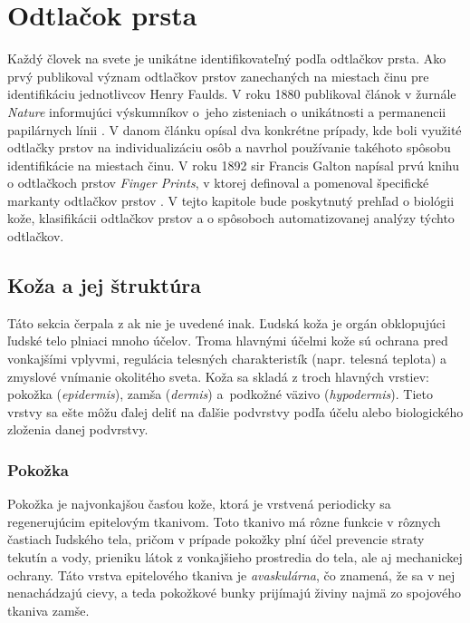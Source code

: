 \chapter{Odtlačok prsta} \label{kap:odtlacok}
  Každý človek na svete je unikátne identifikovateľný podľa odtlačkov prsta. Ako prvý publikoval význam odtlačkov prstov zanechaných na miestach činu
  pre identifikáciu jednotlivcov Henry Faulds. V roku 1880 publikoval článok v žurnále \emph{Nature} informujúci výskumníkov o~jeho zisteniach o unikátnosti
  a permanencii papilárnych línii \cite{FingerprintSrcBook}. V danom článku opísal dva konkrétne prípady, kde boli využité odtlačky prstov na individualizáciu
  osôb a navrhol používanie takéhoto spôsobu identifikácie na miestach činu. V roku 1892 sir Francis Galton napísal prvú knihu o odtlačkoch
  prstov \emph{Finger Prints}, v ktorej definoval a pomenoval špecifické markanty odtlačkov prstov \cite{FingerprintSrcBook}.
  V tejto kapitole bude poskytnutý prehľad o biológii kože, klasifikácii odtlačkov prstov a o spôsoboch automatizovanej analýzy týchto odtlačkov.

  \section{Koža a jej štruktúra}
  Táto sekcia čerpala z \cite{freinkel2001skin} ak nie je uvedené inak.
  Ľudská koža je orgán obklopujúci ľudské telo plniaci mnoho účelov. Troma hlavnými účelmi kože sú ochrana pred vonkajšími vplyvmi, regulácia
  telesných charakteristík (napr. telesná teplota) a zmyslové vnímanie okolitého sveta.
  Koža sa skladá z troch hlavných vrstiev: pokožka (\emph{epidermis}), zamša (\emph{dermis}) a~podkožné väzivo (\emph{hypodermis}). Tieto vrstvy sa ešte môžu
  ďalej deliť na ďalšie podvrstvy podľa účelu alebo biologického zloženia danej podvrstvy.

  \subsection{Pokožka}
  Pokožka je najvonkajšou časťou kože, ktorá je vrstvená periodicky sa regenerujúcim epitelovým tkanivom. Toto tkanivo má rôzne funkcie v rôznych
  častiach ľudského tela, pričom v prípade pokožky plní účel prevencie straty tekutín a vody, prieniku látok z vonkajšieho prostredia do tela, ale aj
  mechanickej ochrany. Táto vrstva epitelového tkaniva je \emph{avaskulárna}, čo znamená, že sa v nej nenachádzajú cievy, a teda pokožkové bunky prijímajú živiny
  najmä zo spojového tkaniva zamše.
  
